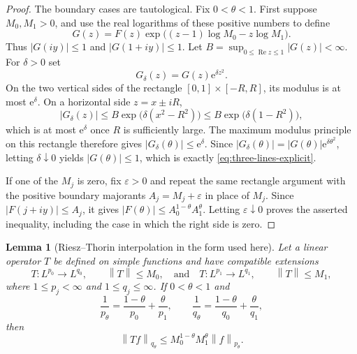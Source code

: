 \documentclass[11pt,oneside]{book}
\newtheorem{lemma}[theorem]{Lemma}
\theoremstyle{definition}
\theoremstyle{remark}
\newcommand{\1}{\mathbf 1}
\newcommand{\Rea}{\operatorname{Re}}
\newcommand{\norm}[1]{\left\lVert #1\right\rVert}
\newcommand{\e}{\mathrm e}
\newcommand{\eps}{\varepsilon}
\begin{document}
\begin{proof}
The boundary cases are tautological.  Fix $0<\theta<1$.  First suppose
$M_0,M_1>0$, and use the real logarithms of these positive numbers to define
\[
 G(z)=F(z)\exp\big((z-1)\log M_0-z\log M_1\big).
\]
Thus $|G(iy)|\le1$ and $|G(1+iy)|\le1$.  Let
$B=\sup_{0\le\Rea z\le1}|G(z)|<\infty$.  For $\delta>0$ set
\[
 G_\delta(z)=G(z)\e^{\delta z^2}.
\]
On the two vertical sides of the rectangle
$[0,1]\times[-R,R]$, its modulus is at most $\e^\delta$.  On a horizontal
side $z=x\pm iR$,
\[
 |G_\delta(z)|\le B\exp\big(\delta(x^2-R^2)\big)
 \le B\exp\big(\delta(1-R^2)\big),
\]
which is at most $\e^\delta$ once $R$ is sufficiently large.  The maximum
modulus principle on this rectangle therefore gives
$|G_\delta(\theta)|\le\e^\delta$.  Since
$|G_\delta(\theta)|=|G(\theta)|\e^{\delta\theta^2}$, letting
$\delta\downarrow0$ yields $|G(\theta)|\le1$, which is exactly
\eqref{eq:three-lines-explicit}.

If one of the $M_j$ is zero, fix $\eps>0$ and repeat the same rectangle
argument with the positive boundary majorants
$A_j=M_j+\eps$ in place of $M_j$.  Since $|F(j+iy)|\le A_j$, it gives
$|F(\theta)|\le A_0^{1-\theta}A_1^\theta$.  Letting
$\eps\downarrow0$ proves the asserted inequality, including the case in
which the right side is zero.
\end{proof}

\begin{lemma}[Riesz--Thorin interpolation in the form used here]
\label{lem:riesz-thorin-used}
Let a linear operator $T$ be defined on simple functions and have compatible
extensions
\[
 T:L^{p_0}\to L^{q_0},\qquad \norm T\le M_0,
 \quad\text{and}\quad
 T:L^{p_1}\to L^{q_1},\qquad \norm T\le M_1,
\]
where $1\le p_j<\infty$ and $1\le q_j\le\infty$.  If
$0<\theta<1$ and
\[
 \frac1{p_\theta}=\frac{1-\theta}{{p_0}}+\frac\theta{p_1},
 \qquad
 \frac1{q_\theta}=\frac{1-\theta}{q_0}+\frac\theta{q_1},
\]
then
\[
 \norm{Tf}_{q_\theta}
 \le M_0^{1-\theta}M_1^\theta\norm f_{p_\theta}.
\]
\end{lemma}
\end{document}
